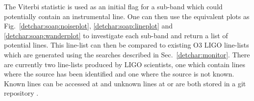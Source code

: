 \bigskip

The Viterbi statistic is used as an initial flag for a sub-band which could
potentially contain an instrumental line.  One can then use the equivalent plots as Fig.~\ref{detchar:soap:noiseplot},
\ref{detchar:soap:lineplot} and \ref{detchar:soap:wanderplot} to investigate each sub-band and return a list of potential lines. 
This line-list can then be compared to existing O3 \gls{LIGO} line-lists which are generated
using the searches described in Sec.~\ref{detchar:monitor}.  There are
currently two line-lists produced by \gls{LIGO} scientists, one which contain
lines where the source has been identified and one where the source is not
known.  Known lines can be accessed at \citep{goetzKnownO3}
and unknown lines at \citep{goetzUnknownO3}
or are both stored in a git repository \citep{goetzLinesGit}.

